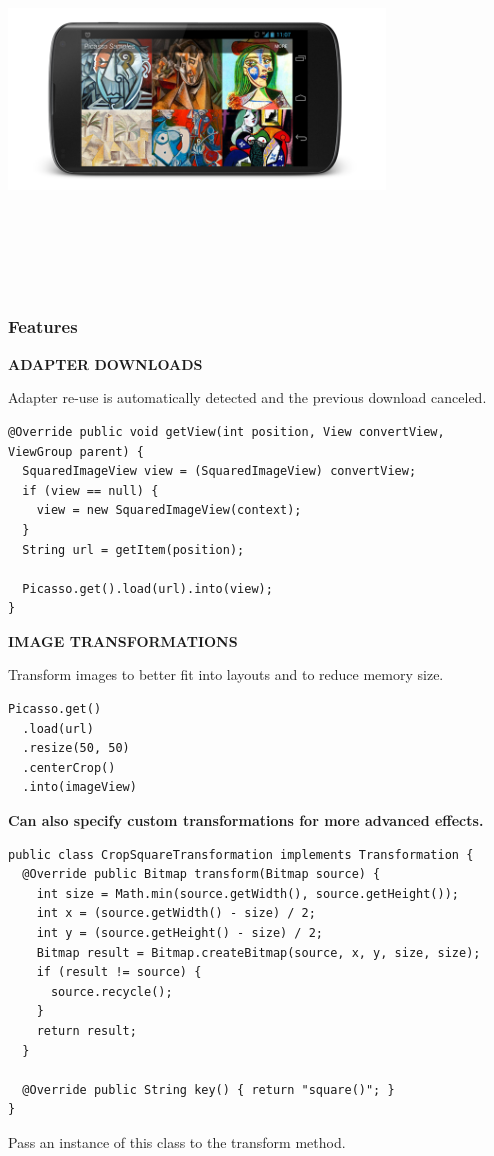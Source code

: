 \begin{center}
    \includegraphics[width=10cm,height=10cm,keepaspectratio]{Images/picassoex1.png}
\end{center}
\newpage

\subsubsection{Features}

\textbf{ADAPTER DOWNLOADS}\newline

Adapter re-use is automatically detected and the previous download canceled.
\begin{lstlisting}
@Override public void getView(int position, View convertView, ViewGroup parent) {
  SquaredImageView view = (SquaredImageView) convertView;
  if (view == null) {
    view = new SquaredImageView(context);
  }
  String url = getItem(position);

  Picasso.get().load(url).into(view);
}
\end{lstlisting}


\textbf{IMAGE TRANSFORMATIONS}\newline

Transform images to better fit into layouts and to reduce memory size.
\begin{lstlisting}
Picasso.get()
  .load(url)
  .resize(50, 50)
  .centerCrop()
  .into(imageView)
\end{lstlisting}
\textbf{Can also specify custom transformations for more advanced effects.}
\begin{lstlisting}
public class CropSquareTransformation implements Transformation {
  @Override public Bitmap transform(Bitmap source) {
    int size = Math.min(source.getWidth(), source.getHeight());
    int x = (source.getWidth() - size) / 2;
    int y = (source.getHeight() - size) / 2;
    Bitmap result = Bitmap.createBitmap(source, x, y, size, size);
    if (result != source) {
      source.recycle();
    }
    return result;
  }

  @Override public String key() { return "square()"; }
}
\end{lstlisting}
Pass an instance of this class to the transform method.
\newpage

